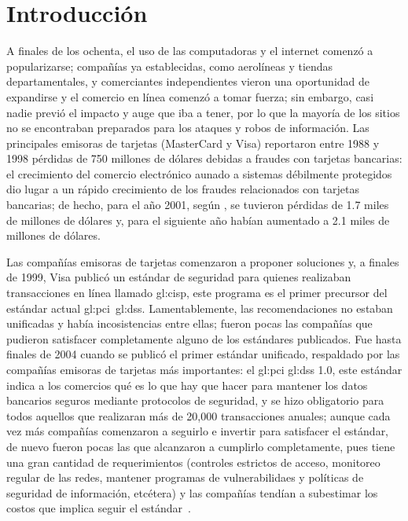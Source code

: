 %
%

\chapter{Introducción}

A finales de los ochenta, el uso de las computadoras y el internet comenzó a
popularizarse; compañías ya establecidas, como aerolíneas y tiendas
departamentales, y comerciantes independientes vieron una oportunidad de
expandirse y el comercio en línea comenzó a tomar fuerza; sin embargo, casi
nadie previó el impacto y auge que iba a tener, por lo que la mayoría de los
sitios no se encontraban preparados para los ataques y robos de información.
Las principales emisoras de tarjetas (MasterCard y Visa) reportaron entre 1988 y
1998 pérdidas de 750 millones de dólares debidas a fraudes con
tarjetas bancarias: el crecimiento del comercio electrónico aunado a
sistemas débilmente protegidos dio lugar a un rápido crecimiento de los
fraudes relacionados con tarjetas bancarias; de hecho, para el año 2001,
según \cite{wallethub}, se tuvieron pérdidas de 1.7 miles de millones de
dólares y, para el siguiente año habían aumentado a 2.1 miles de millones de
dólares.

Las compañías emisoras de tarjetas comenzaron a proponer soluciones y,
a finales de 1999, Visa publicó un estándar de seguridad para quienes realizaban
transacciones en línea llamado \gls{gl:cisp}, este programa es el primer
precursor del estándar actual \gls{gl:pci}~\gls{gl:dss}. Lamentablemente, las
recomendaciones no estaban unificadas y había incosistencias entre ellas; fueron
pocas las compañías que pudieron satisfacer completamente alguno de los
estándares publicados. Fue hasta finales de 2004 cuando se publicó el primer
estándar unificado, respaldado por las compañías emisoras de tarjetas más
importantes: el \gls{gl:pci} \gls{gl:dss} 1.0, este estándar indica a los
comercios qué es lo que hay que hacer para mantener los datos bancarios seguros
mediante protocolos de seguridad, y se hizo obligatorio para todos aquellos que
realizaran más de 20,000 transacciones anuales; aunque cada vez más compañías
comenzaron a seguirlo e invertir para satisfacer el estándar, de nuevo fueron
pocas las que alcanzaron a cumplirlo completamente, pues tiene una
gran cantidad de requerimientos (controles estrictos de acceso,
monitoreo regular de las redes, mantener programas de vulnerabilidaes y
políticas de seguridad de información, etcétera) y las compañías tendían a
subestimar los costos que implica seguir el
estándar~\cite{uk_association, search_security}.

